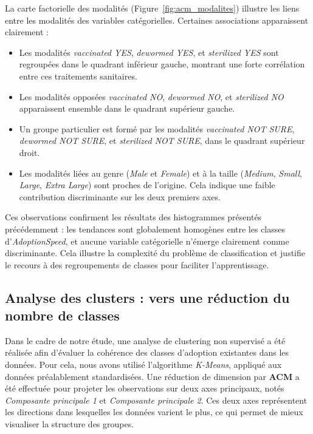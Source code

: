 \documentclass[a4paper,12pt]{article}
\begin{document}
La carte factorielle des modalités (Figure~\ref{fig:acm_modalites}) illustre les liens entre les modalités des variables catégorielles. Certaines associations apparaissent clairement :

\begin{itemize}
    \item Les modalités \textit{vaccinated YES}, \textit{dewormed YES}, et \textit{sterilized YES} sont regroupées dans le quadrant inférieur gauche, montrant une forte corrélation entre ces traitements sanitaires.
    \item Les modalités opposées \textit{vaccinated NO}, \textit{dewormed NO}, et \textit{sterilized NO} apparaissent ensemble dans le quadrant supérieur gauche.
    \item Un groupe particulier est formé par les modalités \textit{vaccinated NOT SURE}, \textit{dewormed NOT SURE}, et \textit{sterilized NOT SURE}, dans le quadrant supérieur droit.
    \item Les modalités liées au genre (\textit{Male} et \textit{Female}) et à la taille (\textit{Medium}, \textit{Small}, \textit{Large}, \textit{Extra Large}) sont proches de l’origine. Cela indique une faible contribution discriminante sur les deux premiers axes.
\end{itemize}

Ces observations confirment les résultats des histogrammes présentés précédemment : les tendances sont globalement homogènes entre les classes d’\textit{AdoptionSpeed}, et aucune variable catégorielle n’émerge clairement comme discriminante. Cela illustre la complexité du problème de classification et justifie le recours à des regroupements de classes pour faciliter l’apprentissage.



\subsection{Analyse des clusters : vers une réduction du nombre de classes}

Dans le cadre de notre étude, une analyse de clustering non supervisé a été réalisée afin d’évaluer la cohérence des classes d’adoption existantes dans les données. Pour cela, nous avons utilisé l’algorithme \textit{K-Means}, appliqué aux données préalablement standardisées. Une réduction de dimension par \textbf{ACM}  a été effectuée pour projeter les observations sur deux axes principaux, notés \textit{Composante principale 1} et \textit{Composante principale 2}. Ces deux axes représentent les directions dans lesquelles les données varient le plus, ce qui permet de mieux visualiser la structure des groupes.
\end{document}

